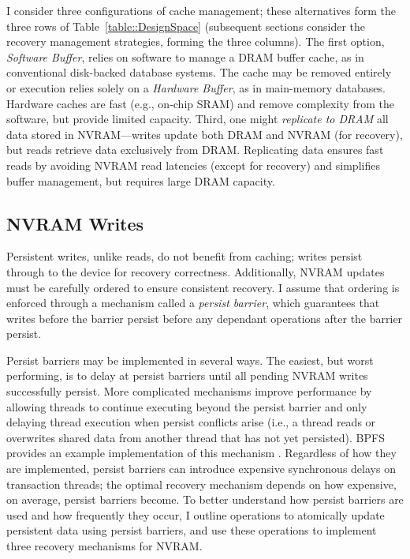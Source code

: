 I consider three configurations of cache management; these alternatives form the three rows of Table~\ref{table::DesignSpace} (subsequent sections consider the recovery management strategies, forming the three columns).
The first option, \emph{Software Buffer}, relies on software to manage a DRAM buffer cache, as in conventional disk-backed database systems.
The cache may be removed entirely or execution relies solely on a \emph{Hardware Buffer}, as in main-memory databases.
Hardware caches are fast (e.g., on-chip SRAM) and remove complexity from the software, but provide limited capacity.
Third, one might \emph{replicate to DRAM} all data stored in NVRAM---writes update both DRAM and NVRAM (for recovery), but reads retrieve data exclusively from DRAM.
Replicating data ensures fast reads by avoiding NVRAM read latencies (except for recovery) and simplifies buf\-fer management, but requires large DRAM capacity.

\subsection{NVRAM Writes}
\label{sec:OLTP_design:Design:Writes}

Persistent writes, unlike reads, do not benefit from cach\-ing; writes persist through to the device for recovery correctness.
Additionally, NVRAM updates must be carefully ordered to ensure consistent recovery.
I assume that ordering is enforced through a mechanism called a \emph{persist barrier}, which guarantees that writes before the barrier persist before any dependant operations after the barrier persist.

Persist barriers may be implemented in several ways.
The easiest, but worst performing, is to delay at persist barriers until all pending NVRAM writes successfully persist.
More complicated mechanisms improve performance by allowing threads to continue executing beyond the persist barrier and only delaying thread execution when persist conflicts arise (i.e., a thread reads or overwrites shared data from another thread that has not yet persisted).
BPFS provides an example implementation of this mechanism \cite{ConditNightingale09}.
Regardless of how they are implemented, persist barriers can introduce expensive synchronous delays on transaction threads; the optimal recovery mechanism depends on how expensive, on average, persist barriers become.
To better understand how persist barriers are used and how frequently they occur, I outline operations to atomically update persistent data using persist barriers, and use these operations to implement three recovery mechanisms for NVRAM.

